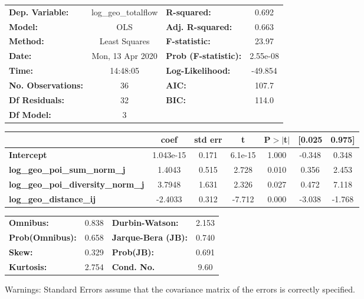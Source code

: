 \begin{center}
\begin{tabular}{lclc}
\toprule
\textbf{Dep. Variable:}                    & log\_geo\_totalflow & \textbf{  R-squared:         } &     0.692   \\
\textbf{Model:}                            &         OLS         & \textbf{  Adj. R-squared:    } &     0.663   \\
\textbf{Method:}                           &    Least Squares    & \textbf{  F-statistic:       } &     23.97   \\
\textbf{Date:}                             &   Mon, 13 Apr 2020  & \textbf{  Prob (F-statistic):} &  2.55e-08   \\
\textbf{Time:}                             &       14:48:05      & \textbf{  Log-Likelihood:    } &   -49.854   \\
\textbf{No. Observations:}                 &            36       & \textbf{  AIC:               } &     107.7   \\
\textbf{Df Residuals:}                     &            32       & \textbf{  BIC:               } &     114.0   \\
\textbf{Df Model:}                         &             3       & \textbf{                     } &             \\
\bottomrule
\end{tabular}
\begin{tabular}{lcccccc}
                                           & \textbf{coef} & \textbf{std err} & \textbf{t} & \textbf{P$> |$t$|$} & \textbf{[0.025} & \textbf{0.975]}  \\
\midrule
\textbf{Intercept}                         &    1.043e-15  &        0.171     &   6.1e-15  &         1.000        &       -0.348    &        0.348     \\
\textbf{log\_geo\_poi\_sum\_norm\_j}       &       1.4043  &        0.515     &     2.728  &         0.010        &        0.356    &        2.453     \\
\textbf{log\_geo\_poi\_diversity\_norm\_j} &       3.7948  &        1.631     &     2.326  &         0.027        &        0.472    &        7.118     \\
\textbf{log\_geo\_distance\_ij}            &      -2.4033  &        0.312     &    -7.712  &         0.000        &       -3.038    &       -1.768     \\
\bottomrule
\end{tabular}
\begin{tabular}{lclc}
\textbf{Omnibus:}       &  0.838 & \textbf{  Durbin-Watson:     } &    2.153  \\
\textbf{Prob(Omnibus):} &  0.658 & \textbf{  Jarque-Bera (JB):  } &    0.740  \\
\textbf{Skew:}          &  0.329 & \textbf{  Prob(JB):          } &    0.691  \\
\textbf{Kurtosis:}      &  2.754 & \textbf{  Cond. No.          } &     9.60  \\
\bottomrule
\end{tabular}
\end{center}

Warnings: \newline
 [1] Standard Errors assume that the covariance matrix of the errors is correctly specified.